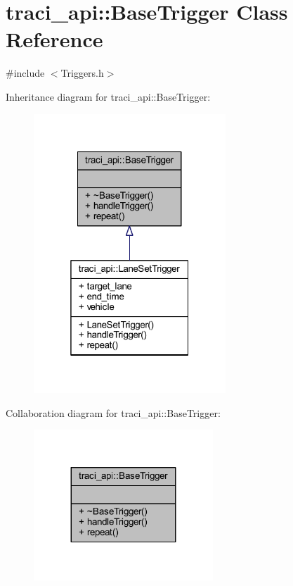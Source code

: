 \hypertarget{classtraci__api_1_1_base_trigger}{}\section{traci\+\_\+api\+:\+:Base\+Trigger Class Reference}
\label{classtraci__api_1_1_base_trigger}


{\ttfamily \#include $<$Triggers.\+h$>$}



Inheritance diagram for traci\+\_\+api\+:\+:Base\+Trigger\+:
\nopagebreak
\begin{figure}[H]
\begin{center}
\leavevmode
\includegraphics[width=205pt]{classtraci__api_1_1_base_trigger__inherit__graph}
\end{center}
\end{figure}


Collaboration diagram for traci\+\_\+api\+:\+:Base\+Trigger\+:
\nopagebreak
\begin{figure}[H]
\begin{center}
\leavevmode
\includegraphics[width=191pt]{classtraci__api_1_1_base_trigger__coll__graph}
\end{center}
\end{figure}

